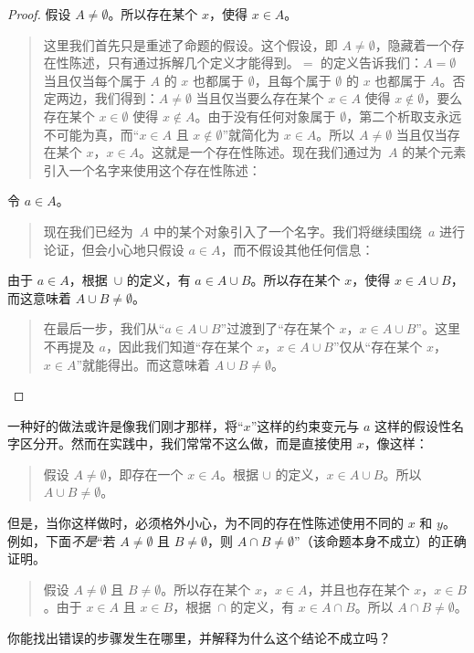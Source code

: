 \documentclass[../../../include/open-logic-section]{subfiles}
\begin{document}
\begin{proof}
  假设 $A \neq \emptyset$。所以存在某个 $x$，使得 $x \in A$。
  \begin{quote}
    这里我们首先只是重述了命题的假设。这个假设，即 $A \neq \emptyset$，隐藏着一个存在性陈述，只有通过拆解几个定义才能得到。$=$ 的定义告诉我们：$A = \emptyset$ 当且仅当每个属于 $A$ 的 $x$ 也都属于 $\emptyset$，且每个属于 $\emptyset$ 的 $x$ 也都属于 $A$。否定两边，我们得到：$A \neq \emptyset$ 当且仅当要么存在某个 $x \in A$ 使得 $x \notin \emptyset$，要么存在某个 $x \in \emptyset$ 使得 $x \notin A$。由于没有任何对象属于 $\emptyset$，第二个析取支永远不可能为真，而“$x \in A$ 且 $x \notin \emptyset$”就简化为 $x \in A$。所以 $A \neq \emptyset$ 当且仅当存在某个 $x$，$x \in A$。这就是一个存在性陈述。现在我们通过为~$A$ 的某个元素引入一个名字来使用这个存在性陈述：
  \end{quote}
  令 $a \in A$。
  \begin{quote}
    现在我们已经为~$A$ 中的某个对象引入了一个名字。我们将继续围绕~$a$ 进行论证，但会小心地只假设 $a \in A$，而不假设其他任何信息：
  \end{quote}
  由于 $a \in A$，根据~$\cup$ 的定义，有 $a \in A \cup B$。所以存在某个 $x$，使得 $x \in A \cup B$，而这意味着 $A \cup B \neq \emptyset$。
  \begin{quote}
    在最后一步，我们从“$a \in A \cup B$”过渡到了“存在某个 $x$，$x \in A \cup B$”。这里不再提及 $a$，因此我们知道“存在某个 $x$，$x \in A \cup B$”仅从“存在某个 $x$，$x \in A$”就能得出。而这意味着 $A \cup B \neq \emptyset$。
  \end{quote}
\end{proof}

一种好的做法或许是像我们刚才那样，将“$x$”这样的约束变元与 $a$ 这样的假设性名字区分开。然而在实践中，我们常常不这么做，而是直接使用 $x$，像这样：

\begin{quote}
假设 $A \neq \emptyset$，即存在一个 $x \in A$。根据 $\cup$ 的定义，$x \in A \cup B$。所以 $A \cup B \neq \emptyset$。
\end{quote}

但是，当你这样做时，必须格外小心，为不同的存在性陈述使用不同的 $x$ 和 $y$。例如，下面\emph{不是}“若 $A \neq \emptyset$ 且 $B \neq \emptyset$，则 $A \cap B \neq \emptyset$”（该命题本身不成立）的正确证明。

\begin{quote}
假设 $A \neq \emptyset$ 且 $B \neq \emptyset$。所以存在某个 $x$，$x \in A$，并且也存在某个 $x$，$x \in B$。由于 $x \in A$ 且 $x \in B$，根据~$\cap$ 的定义，有 $x \in A \cap B$。所以 $A \cap B \neq \emptyset$。
\end{quote}

你能找出错误的步骤发生在哪里，并解释为什么这个结论不成立吗？
\end{document}
